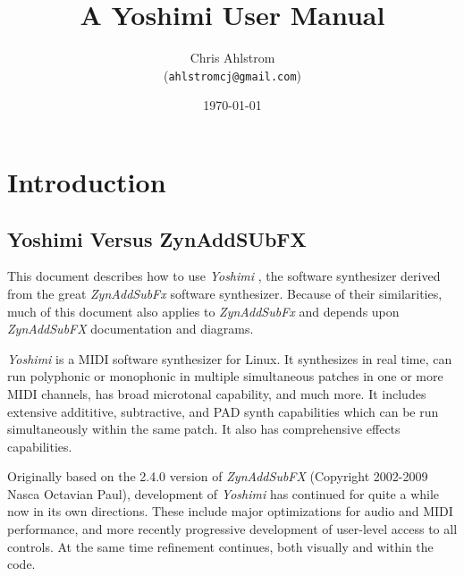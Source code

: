 \documentclass[
 11pt,
 twoside,
 a4paper,
 headinclude,
 footinclude,
 final                                 %
]{article}
\begin{document}
\title{A Yoshimi User Manual}
\author{Chris Ahlstrom\\
   (\texttt{ahlstromcj@gmail.com})}
\date{\today}
\maketitle
\tableofcontents
\listoffigures                         %


\setlength{\parindent}{0pt}
\setlength{\parskip}{1ex plus 0.5ex minus 0.2ex}

\section{Introduction}
\label{sec:introduction}

\subsection{Yoshimi Versus ZynAddSUbFX}
\label{subsec:introduction_yoshimi_vs_zyn}

   This document describes how to use \textsl{Yoshimi} \cite{yoshimi},
   the software synthesizer derived from the great
   \textsl{ZynAddSubFx} \cite{zynaddsubfx} software
   synthesizer.  Because of their similarities, much of this document also
   applies to \textsl{ZynAddSubFx} and depends upon \textsl{ZynAddSubFX}
   documentation and diagrams.

   \textsl{Yoshimi} is a MIDI software synthesizer for Linux. It synthesizes
   in real time, can run polyphonic or monophonic in multiple
   simultaneous patches in one or more MIDI channels, has broad microtonal
   capability, and much more. It includes extensive addititive, subtractive,
   and PAD synth capabilities which can be run simultaneously within the
   same patch.  It also has comprehensive effects capabilities.

   Originally based on the 2.4.0 version of \textsl{ZynAddSubFX} (Copyright
   2002-2009 Nasca Octavian Paul), development of \textsl{Yoshimi} has
   continued for quite a while now in its own directions. These include
   major optimizations for audio and MIDI performance, and more recently
   progressive development of user-level access to all controls. At the same
   time refinement continues, both visually and within the code.
\end{document}
